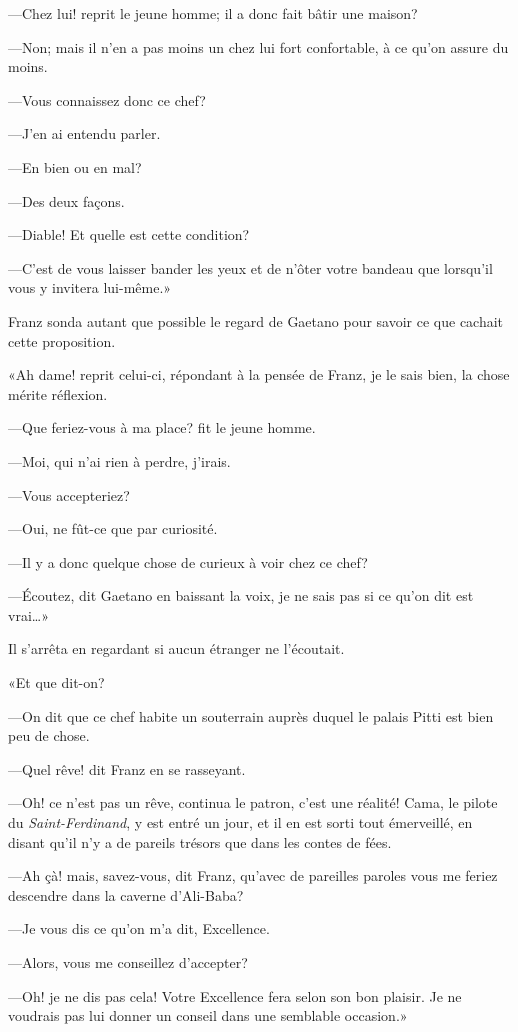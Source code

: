—Chez lui! reprit le jeune homme; il a donc fait bâtir une maison?

—Non; mais il n'en a pas moins un chez lui fort confortable, à ce qu'on assure du moins.

—Vous connaissez donc ce chef?

—J'en ai entendu parler.

—En bien ou en mal?

—Des deux façons.

—Diable! Et quelle est cette condition?

—C'est de vous laisser bander les yeux et de n'ôter votre bandeau que lorsqu'il vous y invitera lui-même.»

Franz sonda autant que possible le regard de Gaetano pour savoir ce que cachait cette proposition.

«Ah dame! reprit celui-ci, répondant à la pensée de Franz, je le sais bien, la chose mérite réflexion.

—Que feriez-vous à ma place? fit le jeune homme.

—Moi, qui n'ai rien à perdre, j'irais.

—Vous accepteriez?

—Oui, ne fût-ce que par curiosité.

—Il y a donc quelque chose de curieux à voir chez ce chef?

—Écoutez, dit Gaetano en baissant la voix, je ne sais pas si ce qu'on dit est vrai\dots»

Il s'arrêta en regardant si aucun étranger ne l'écoutait.

«Et que dit-on?

—On dit que ce chef habite un souterrain auprès duquel le palais Pitti est bien peu de chose.

—Quel rêve! dit Franz en se rasseyant.

—Oh! ce n'est pas un rêve, continua le patron, c'est une réalité! Cama, le pilote du \textit{Saint-Ferdinand}, y est entré un jour, et il en est sorti tout émerveillé, en disant qu'il n'y a de pareils trésors que dans les contes de fées.

—Ah çà! mais, savez-vous, dit Franz, qu'avec de pareilles paroles vous me feriez descendre dans la caverne d'Ali-Baba?

—Je vous dis ce qu'on m'a dit, Excellence.

—Alors, vous me conseillez d'accepter?

—Oh! je ne dis pas cela! Votre Excellence fera selon son bon plaisir. Je ne voudrais pas lui donner un conseil dans une semblable occasion.»

